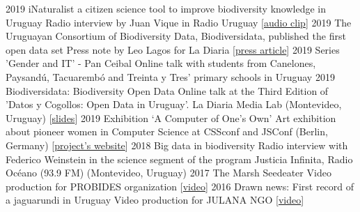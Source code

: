 \documentclass[9pt]{developercv} %
\begin{document}
\begin{entrylist}
	\entrylong
		{2019}
		{iNaturalist a citizen science tool to improve biodiversity knowledge in Uruguay}
		{}
		{Radio interview by Juan Vique in Radio Uruguay [\href{https://sobreciencia.uy/inaturalist-una-apuesta-a-la-ciencia-ciudadana/}{audio clip}]}
	\entrylong
		{2019}
		{The Uruguayan Consortium of Biodiversity Data, Biodiversidata, published the first open data set}
		{}
		{Press note by Leo Lagos for La Diaria [\href{https://ladiaria.com.uy/ciencia/articulo/2019/7/el-consorcio-de-datos-de-biodiversidad-de-uruguay-biodiversidata-publico-el-primer-set-de-datos-abiertos/}{press article}]}
	\entrylong
		{2019}
		{Series 'Gender and IT' -  Pan Ceibal}
		{}
		{Online talk with students from Canelones, Paysandú, Tacuarembó and Treinta y Tres' primary schools in Uruguay}
	\entrylong
		{2019}
		{Biodiversidata: Biodiversity Open Data}
		{}
		{Online talk at the Third Edition of 'Datos y Cogollos: Open Data in Uruguay'. La Diaria Media Lab (Montevideo, Uruguay) [\href{https://flograttarola.com/talk/biodiversidata.-datos-abiertos-de-biodiversidad/Biodiversidata_Datos_y_Cogollos_OCT2019.pdf}{slides}]}
	\entrylong
		{2019}
		{Exhibition ‘A Computer of One’s Own’}
		{}
		{Art exhibition about pioneer women in Computer Science at CSSconf and JSConf (Berlin, Germany) [\href{https://medium.com/a-computer-of-ones-own}{project's website}]}
	\entrylong
		{2018}
		{Big data in biodiversity}
		{}
		{Radio interview with Federico Weinstein in the science segment of the program Justicia Infinita, Radio Océano (93.9 FM) (Montevideo, Uruguay)}
	\entrylong
		{2017}
		{The Marsh Seedeater}
		{}
		{Video production for PROBIDES organization [\href{https://youtu.be/EYKt83ShWQ8}{video}]}
	\entrylong
		{2016}
		{Drawn news: First record of a jaguarundi in Uruguay}
		{}
		{Video production for JULANA NGO [\href{https://youtu.be/Zva9m9hmXCc}{video}]}	
\end{entrylist}




%
%	
%	
%	
%	
%	
\end{document}
